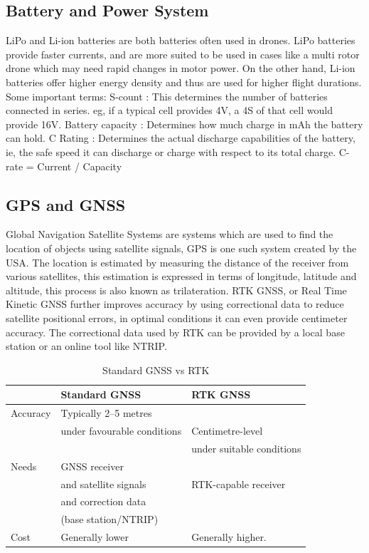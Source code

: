 \documentclass[conference]{IEEEtran}
\begin{document}
\subsection{Battery and Power System}
LiPo and Li-ion batteries are both batteries often used in drones. LiPo batteries provide faster currents, and are more suited to be used in cases like a multi rotor drone which may need rapid changes in motor power.
On the other hand, Li-ion batteries offer higher energy density and thus are used for higher flight durations.
Some important terms:
S-count : This determines the number of batteries connected in series. eg, if a typical cell provides 4V, a 4S of that cell would provide 16V.
Battery capacity : Determines how much charge in mAh the battery can hold.
C Rating : Determines the actual discharge capabilities of the battery, ie, the safe speed it can discharge or charge with respect to its total charge. 
C-rate = Current / Capacity

\subsection{GPS and GNSS}
Global Navigation Satellite Systems are systems which are used to find the location of objects using satellite signals, GPS is one such system created by the USA. The location is estimated by measuring the distance of the receiver from various satellites, this estimation is expressed in terms of longitude, latitude and altitude, this process is also known as trilateration. 
RTK GNSS, or Real Time Kinetic GNSS further improves accuracy by using correctional data to reduce satellite positional errors, in optimal conditions it can even provide centimeter accuracy. The correctional data used by RTK can be provided by a local base station or an online tool like NTRIP.
\begin{table}[h]
\centering\caption{Standard GNSS vs RTK}
\begin{tabular}{lll}\toprule
 & Standard GNSS & RTK GNSS\\\midrule
Accuracy & Typically 2–5 metres\\& under favourable conditions & Centimetre-level \\&&under suitable conditions\\
Needs & GNSS receiver \\  &  and satellite signals & RTK-capable receiver\\ &and correction data \\&(base station/NTRIP)\\
Cost & Generally lower & Generally higher.\\\bottomrule
\end{tabular}
\end{table}
\end{document}

